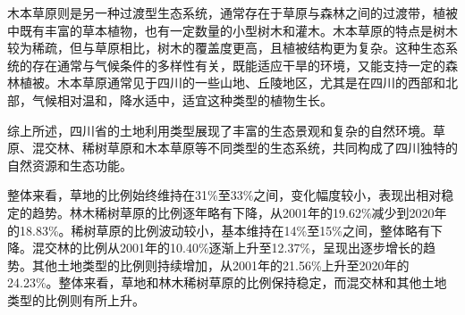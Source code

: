 \documentclass{article}
\begin{document}
		木本草原则是另一种过渡型生态系统，通常存在于草原与森林之间的过渡带，植被中既有丰富的草本植物，也有一定数量的小型树木和灌木。木本草原的特点是树木较为稀疏，但与草原相比，树木的覆盖度更高，且植被结构更为复杂。这种生态系统的存在通常与气候条件的多样性有关，既能适应干旱的环境，又能支持一定的森林植被。木本草原通常见于四川的一些山地、丘陵地区，尤其是在四川的西部和北部，气候相对温和，降水适中，适宜这种类型的植物生长。
		
		综上所述，四川省的土地利用类型展现了丰富的生态景观和复杂的自然环境。草原、混交林、稀树草原和木本草原等不同类型的生态系统，共同构成了四川独特的自然资源和生态功能。
		
		
		整体来看，草地的比例始终维持在31\%至33\%之间，变化幅度较小，表现出相对稳定的趋势。林木稀树草原的比例逐年略有下降，从2001年的19.62\%减少到2020年的18.83\%。稀树草原的比例波动较小，基本维持在14\%至15\%之间，整体略有下降。混交林的比例从2001年的10.40\%逐渐上升至12.37\%，呈现出逐步增长的趋势。其他土地类型的比例则持续增加，从2001年的21.56\%上升至2020年的24.23\%。整体来看，草地和林木稀树草原的比例保持稳定，而混交林和其他土地类型的比例则有所上升。
		
\end{document}
